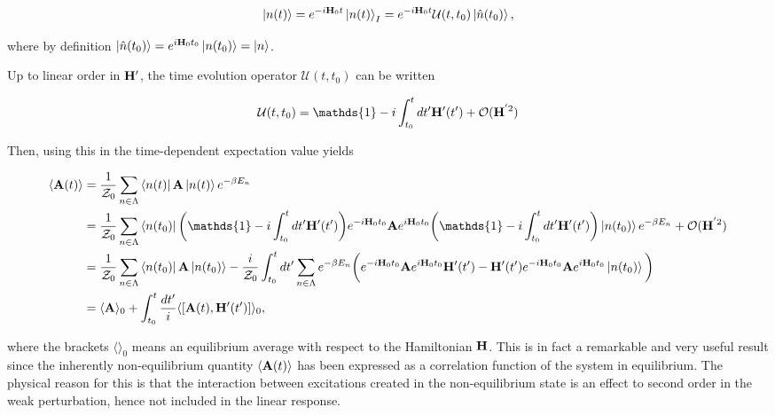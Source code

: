 \documentclass{homework}
\begin{document}
\begin{equation}
    \ket{n(t)} = e^{-i{\bf H}_0 t} \ket{n(t)}_I = e^{-i{\bf H}_0 t} \mathcal{U}(t, t_0) \ket{\hat{n}(t_0)},
\end{equation}

where by definition $\ket{\hat{n}(t_0)} = e^{i {\bf H}_0 t_0} \ket{n(t_0)} = \ket{n}$.

Up to linear order in ${\bf H}'$, the time evolution operator $\mathcal{U}(t, t_0)$ can be written 

$$
    \mathcal{U}(t, t_0) = \mathds{1} - i \int_{t_0}^t dt' \Hamiltonian'(t') + \mathcal{O}(\Hamiltonian^{'2})
$$

Then, using this in the time-dependent expectation value yields 

\begin{equation} \begin{split}
    \langle {\bf A}(t) \rangle &= \frac{1}{\mathcal{Z}_0} \sum_{n \in \Lambda} \bra{n(t)} {{\bf A}} \ket{n(t)} e^{-\beta E_n} \\
    &= \frac{1}{\mathcal{Z}_0} \sum_{n \in \Lambda} \bra{n(t_0)} \bigg(\mathds{1} - i \int_{t_0}^t dt' \Hamiltonian'(t')\bigg) e^{-i \Hamiltonian_0 t_0} {{\bf A}} e^{i \Hamiltonian_0 t_0} \bigg(\mathds{1} - i \int_{t_0}^t dt' \Hamiltonian'(t')\bigg) \ket{n(t_0)}  e^{-\beta E_n}+ \mathcal{O}(\Hamiltonian^{'2}) \\
    &= \frac{1}{\mathcal{Z}_0} \sum_{n \in \Lambda} \bra{n(t_0)} {{\bf A}} \ket{n(t_0)} - \frac{i}{\mathcal{Z}_0} \int_{t_0}^{t} dt' \sum_{n \in \Lambda} e^{-\beta E_n} \bigg( e^{-i \Hamiltonian_0 t_0} {{\bf A}} e^{i \Hamiltonian_0 t_0} \Hamiltonian'(t') - \Hamiltonian'(t')e^{-i \Hamiltonian_0 t_0} {{\bf A}} e^{i \Hamiltonian_0 t_0} \ket{n(t_0)} \bigg) \\
    &= \langle {{\bf A}} \rangle_{0} + \int_{t_0}^{t} \frac{dt'}{i} \langle[{{\bf A}}(t), \Hamiltonian'(t')]\rangle_{0},
\end{split}
\end{equation}

where the brackets $\langle \rangle_{0}$ means an equilibrium average with respect to the Hamiltonian ${\bf H}$. This is in fact a remarkable and very useful result since the inherently non-equilibrium quantity $\langle {{\bf A}}(t) \rangle$ has been expressed as a correlation function of the system in equilibrium. The physical reason for this is that the interaction between excitations created in the non-equilibrium state is an effect to second order in the weak perturbation, hence not included in the linear response. \\
\end{document}
